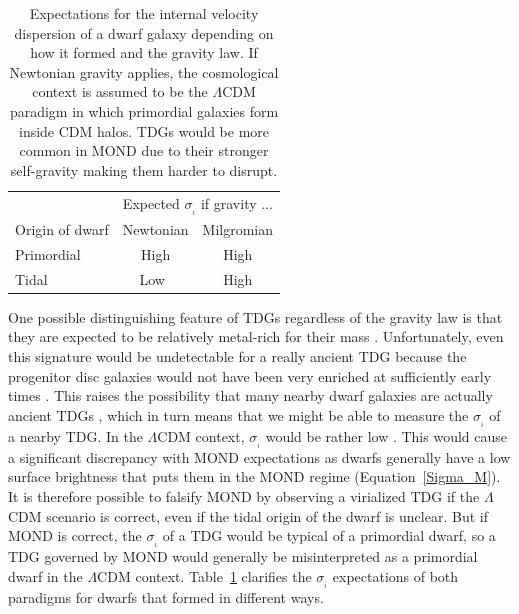 \documentclass[fleqn,usenatbib,useAMS]{mnras} %
\begin{document}
\begin{table}
	\centering
	\begin{tabular}{lcc}
		\hline
		& \multicolumn{2}{c}{Expected $\sigma_{_i}$ if gravity $\ldots$} \\
		Origin of dwarf & Newtonian & Milgromian \\ \hline
		Primordial & High & High \\
		Tidal & Low~ & High \\ \hline
	\end{tabular}
	\caption{Expectations for the internal velocity dispersion of a dwarf galaxy depending on how it formed and the gravity law. If Newtonian gravity applies, the cosmological context is assumed to be the $\Lambda$CDM paradigm in which primordial galaxies form inside CDM halos. TDGs would be more common in MOND due to their stronger self-gravity making them harder to disrupt.}
	\label{Dwarf_type_gravity_sigma}
\end{table}

One possible distinguishing feature of TDGs regardless of the gravity law is that they are expected to be relatively metal-rich for their mass \citep{Duc_2014, Recchi_2015, Haslbauer_2019}. Unfortunately, even this signature would be undetectable for a really ancient TDG because the progenitor disc galaxies would not have been very enriched at sufficiently early times \citep{Recchi_2015}. This raises the possibility that many nearby dwarf galaxies are actually ancient TDGs \citep{Okazaki_2000}, which in turn means that we might be able to measure the $\sigma_{_i}$ of a nearby TDG. In the $\Lambda$CDM context, $\sigma_{_i}$ would be rather low \citep{Barnes_1992, Elmegreen_1993, Wetzstein_2007, Ploeckinger_2015}. This would cause a significant discrepancy with MOND expectations as dwarfs generally have a low surface brightness that puts them in the MOND regime (Equation~\ref{Sigma_M}). It is therefore possible to falsify MOND by observing a virialized TDG if the $\Lambda$CDM scenario is correct, even if the tidal origin of the dwarf is unclear. But if MOND is correct, the $\sigma_{_i}$ of a TDG would be typical of a primordial dwarf, so a TDG governed by MOND would generally be misinterpreted as a primordial dwarf in the $\Lambda$CDM context. Table~\ref{Dwarf_type_gravity_sigma} clarifies the $\sigma_{_i}$ expectations of both paradigms for dwarfs that formed in different ways.
\end{document}
